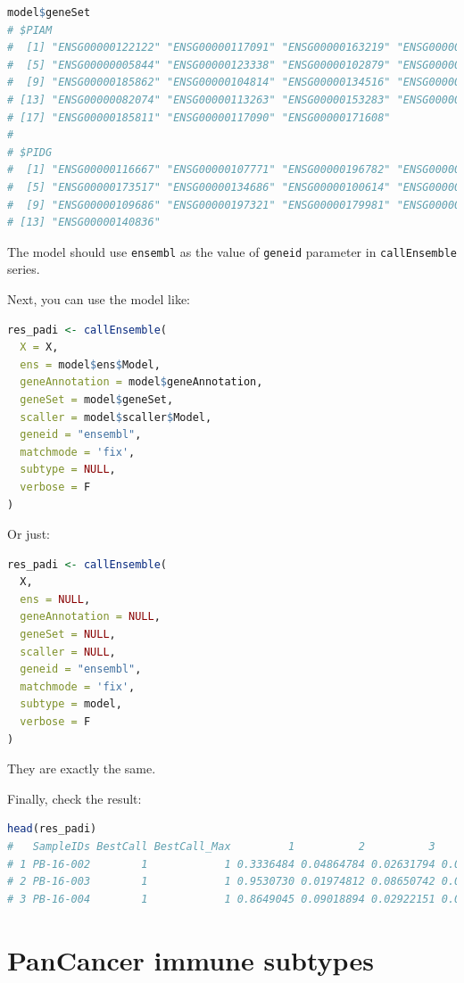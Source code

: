 \documentclass[
  12pt,
]{book}
\newcommand{\passthrough}[1]{#1}
\begin{document}
\begin{lstlisting}[language=R]
model$geneSet
# $PIAM
#  [1] "ENSG00000122122" "ENSG00000117091" "ENSG00000163219" "ENSG00000136167"
#  [5] "ENSG00000005844" "ENSG00000123338" "ENSG00000102879" "ENSG00000010671"
#  [9] "ENSG00000185862" "ENSG00000104814" "ENSG00000134516" "ENSG00000100055"
# [13] "ENSG00000082074" "ENSG00000113263" "ENSG00000153283" "ENSG00000198821"
# [17] "ENSG00000185811" "ENSG00000117090" "ENSG00000171608"
# 
# $PIDG
#  [1] "ENSG00000116667" "ENSG00000107771" "ENSG00000196782" "ENSG00000271447"
#  [5] "ENSG00000173517" "ENSG00000134686" "ENSG00000100614" "ENSG00000134247"
#  [9] "ENSG00000109686" "ENSG00000197321" "ENSG00000179981" "ENSG00000187189"
# [13] "ENSG00000140836"
\end{lstlisting}

The model should use \passthrough{\lstinline!ensembl!} as the value of \passthrough{\lstinline!geneid!} parameter in \passthrough{\lstinline!callEnsemble!} series.

Next, you can use the model like:

\begin{lstlisting}[language=R]
res_padi <- callEnsemble(
  X = X,
  ens = model$ens$Model,
  geneAnnotation = model$geneAnnotation,
  geneSet = model$geneSet,
  scaller = model$scaller$Model,
  geneid = "ensembl",
  matchmode = 'fix',
  subtype = NULL,
  verbose = F
)
\end{lstlisting}

Or just:

\begin{lstlisting}[language=R]
res_padi <- callEnsemble(
  X,
  ens = NULL,
  geneAnnotation = NULL,
  geneSet = NULL,
  scaller = NULL,
  geneid = "ensembl",
  matchmode = 'fix',
  subtype = model, 
  verbose = F
)
\end{lstlisting}

They are exactly the same.

Finally, check the result:

\begin{lstlisting}[language=R]
head(res_padi)
#   SampleIDs BestCall BestCall_Max         1          2          3           4
# 1 PB-16-002        1            1 0.3336484 0.04864784 0.02631794 0.023372779
# 2 PB-16-003        1            1 0.9530730 0.01974812 0.08650742 0.007271698
# 3 PB-16-004        1            1 0.8649045 0.09018894 0.02922151 0.011559768
\end{lstlisting}

\hypertarget{pancancer-immune-subtypes}{%
\section{PanCancer immune subtypes}\label{pancancer-immune-subtypes}}
\end{document}
